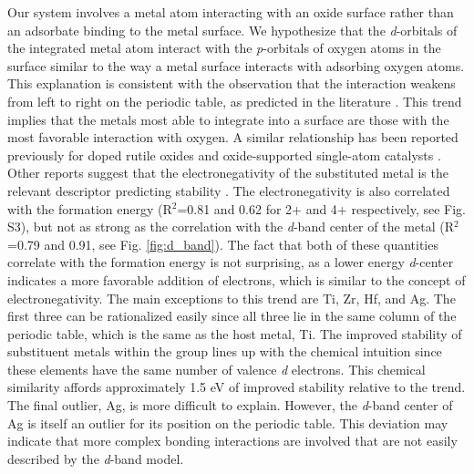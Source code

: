 Our system involves a metal atom interacting with an oxide surface rather than an adsorbate binding to the metal surface. We hypothesize that the \textit{d}-orbitals of the integrated metal atom interact with the \textit{p}-orbitals of oxygen atoms in the surface similar to the way a metal surface interacts with adsorbing oxygen atoms. This explanation is consistent with the observation that the interaction weakens from left to right on the periodic table, as predicted in the literature \cite{Hammer_2000}. This trend implies that the metals most able to integrate into a surface are those with the most favorable interaction with oxygen. A similar relationship has been reported previously for doped rutile oxides \cite{Xu_2015} and oxide-supported single-atom catalysts \cite{O_Connor_2018}. Other reports suggest that the electronegativity of the substituted metal is the relevant descriptor predicting stability \cite{Garc_a_Mota_2011}. The electronegativity is also correlated with the formation energy (R$^2$=0.81 and 0.62 for 2+ and 4+ respectively, see Fig. S3), but not as strong as the correlation with the \textit{d}-band center of the metal (R$^2$=0.79 and 0.91, see Fig. \ref{fig:d_band}). The fact that both of these quantities correlate with the formation energy is not surprising, as a lower energy \textit{d}-center indicates a more favorable addition of electrons, which is similar to the concept of electronegativity. %
The main exceptions to this trend are Ti, Zr, Hf, and Ag. The first three can be rationalized easily since all three lie in the same column of the periodic table, which is the same as the host metal, Ti. The improved stability of substituent metals within the group lines up with the chemical intuition since these elements have the same number of valence \textit{d} electrons. This chemical similarity affords approximately 1.5 eV of improved stability relative to the trend. The final outlier, Ag, is more difficult to explain. However, the \textit{d}-band center of Ag is itself an outlier for its position on the periodic table. This deviation may indicate that more complex bonding interactions are involved that are not easily described by the \textit{d}-band model.

